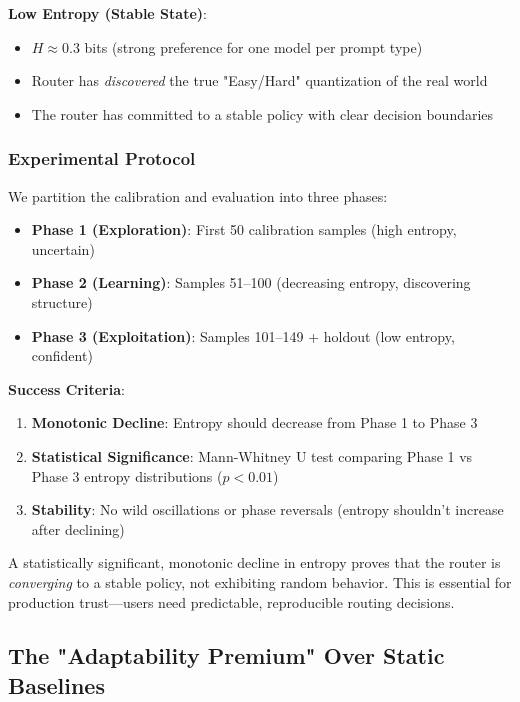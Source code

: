 \textbf{Low Entropy (Stable State)}:
\begin{itemize}
    \item $H \approx 0.3$ bits (strong preference for one model per prompt type)
    \item Router has \emph{discovered} the true "Easy/Hard" quantization of the real world
    \item The router has committed to a stable policy with clear decision boundaries
\end{itemize}

\subsubsection{Experimental Protocol}

We partition the calibration and evaluation into three phases:
\begin{itemize}
    \item \textbf{Phase 1 (Exploration)}: First 50 calibration samples (high entropy, uncertain)
    \item \textbf{Phase 2 (Learning)}: Samples 51--100 (decreasing entropy, discovering structure)
    \item \textbf{Phase 3 (Exploitation)}: Samples 101--149 + holdout (low entropy, confident)
\end{itemize}

\textbf{Success Criteria}:
\begin{enumerate}
    \item \textbf{Monotonic Decline}: Entropy should decrease from Phase 1 to Phase 3
    \item \textbf{Statistical Significance}: Mann-Whitney U test comparing Phase 1 vs Phase 3 entropy distributions ($p < 0.01$)
    \item \textbf{Stability}: No wild oscillations or phase reversals (entropy shouldn't increase after declining)
\end{enumerate}

A statistically significant, monotonic decline in entropy proves that the router is \emph{converging} to a stable policy, not exhibiting random behavior. This is essential for production trust—users need predictable, reproducible routing decisions.

\subsection{The "Adaptability Premium" Over Static Baselines}
\label{sec:adaptability_premium}

